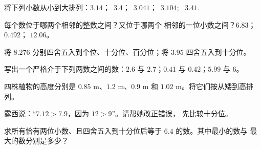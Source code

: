 \begin{exercise}[$\star$]\label{exo:g5:decimals:5}
将下列小数从小到大排列：$3.14$；\ $3.4$；\ $3.041$；\
$3.104$; \ $3.41$.
\end{exercise}

\begin{exercise}[$\star$]\label{exo:g5:decimals:6}
每个数位于哪两个相邻的整数之间？又位于哪两个
相邻的一位小数之间？\quad $6.83$；\quad $0.492$；\quad
$12.06$。
\end{exercise}

\begin{exercise}[$\star$]\label{exo:g5:decimals:7}
将 $8.276$ 分别四舍五入到个位、十分位、百分位；将
$3.95$ 四舍五入到十分位。
\end{exercise}

\begin{exercise}[$\star$]\label{exo:g5:decimals:8}
写出一个严格介于下列两数之间的数：$2.6$ 与 $2.7$；\quad $0.41$ 与
$0.42$；\quad $5.99$ 与 $6$。
\end{exercise}

\begin{exercise}[$\star$]\label{exo:g5:decimals:9}
四株植物的高度分别是 $0.85$ m、$1.2$ m、$0.9$ m 和
$1.02$ m。将它们按从矮到高排列。
\end{exercise}

\begin{exercise}[$\star\star$]\label{exo:g5:decimals:10}
露西说：“$7.12 > 7.9$，因为 $12 > 9$”。请帮她改正错误，
先比较十分位。
\end{exercise}

\begin{exercise}[$\star\star$]\label{exo:g5:decimals:11}
求所有恰有两位小数、且四舍五入到十分位后等于
$6.4$ 的数。其中最小的数与
最大的数分别是多少？
\end{exercise}
